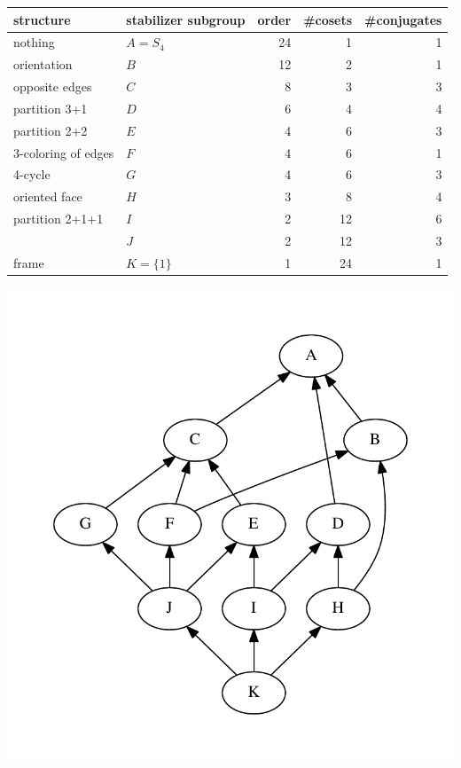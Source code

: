 \documentclass[11pt,oneside]{article}
\begin{document}
\begin{samepage}
\begin{center}
\begin{tabular}{ |l|l|r|r|r| }
\hline
structure & stabilizer subgroup & order & \#cosets & \#conjugates \\
\hline
\hline
nothing & $A=S_4$ &       24        &  1      &   1         \\
\hline
orientation & $B$ &       12        &  2      &   1         \\
\hline
opposite edges & $C$ &       8        &  3      &   3         \\
\hline
partition 3+1 & $D$ &       6        &  4      &   4         \\
\hline
partition 2+2 & $E$ &       4        &  6      &   3      \\
\hline
3-coloring of edges & $F$ &       4        &  6      &   1     \\
\hline
4-cycle & $G$ &       4        &  6      &   3    \\
\hline
oriented face & $H$ &       3        &  8      &   4         \\
\hline
partition 2+1+1 & $I$ &       2        &  12      &   6       \\
\hline
   & $J$ &       2        &  12      &    3       \\
\hline
frame & $K=\{1\} $ &       1        &  24      &   1         \\
\hline
\end{tabular}
\end{center}
\end{samepage}

\begin{center}
\includegraphics[width=0.5\columnwidth]{subgroups_s4.pdf} 
\end{center}
\end{document}

